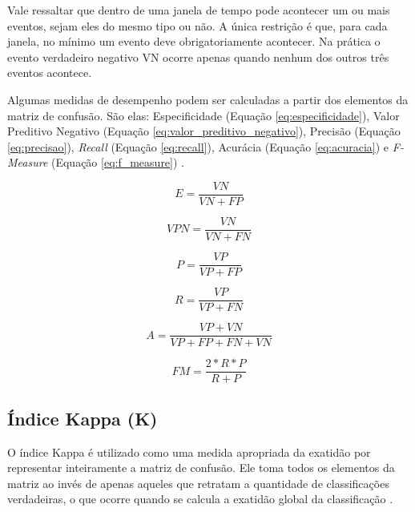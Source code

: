 Vale ressaltar que dentro de uma janela de tempo pode acontecer um ou mais eventos, sejam eles do mesmo tipo ou não. A única restrição é que, para cada janela, no mínimo um evento deve obrigatoriamente acontecer. Na prática o evento verdadeiro negativo VN ocorre apenas quando nenhum dos outros três eventos acontece.

Algumas medidas de desempenho podem ser calculadas a partir dos elementos da matriz de confusão. São elas: Especificidade (Equação \ref{eq:especificidade}), Valor Preditivo Negativo (Equação \ref{eq:valor_preditivo_negativo}), Precisão (Equação \ref{eq:precisao}), \textit{Recall} (Equação \ref{eq:recall}), Acurácia (Equação \ref{eq:acuracia}) e \textit{F-Measure} (Equação \ref{eq:f_measure}) \citep{powers07evaluation}.

\begin{equation}
  \label{eq:especificidade}
  E=\dfrac{VN}{VN+FP}
\end{equation}

\begin{equation}
  \label{eq:valor_preditivo_negativo}
  VPN=\dfrac{VN}{VN+FN}
\end{equation}

\begin{equation}
  \label{eq:precisao}
  P=\dfrac{VP}{VP+FP}
\end{equation}

\begin{equation}
  \label{eq:recall}
  R=\dfrac{VP}{VP+FN}
\end{equation}

\begin{equation}
  \label{eq:acuracia}
  A=\dfrac{VP+VN}{VP+FP+FN+VN}
\end{equation}

\begin{equation}
  \label{eq:f_measure}
  FM=\dfrac{2*R*P}{R+P}
\end{equation}


\subsection{Índice Kappa (K)} %
\label{sub:_ndice_kappa_}

O índice Kappa é utilizado como uma medida apropriada da exatidão por representar inteiramente a matriz de confusão. Ele toma todos os elementos da matriz ao invés de apenas aqueles que retratam a quantidade de classificações verdadeiras, o que ocorre quando se calcula a exatidão global da classificação \citep{Jnl605963009}.

